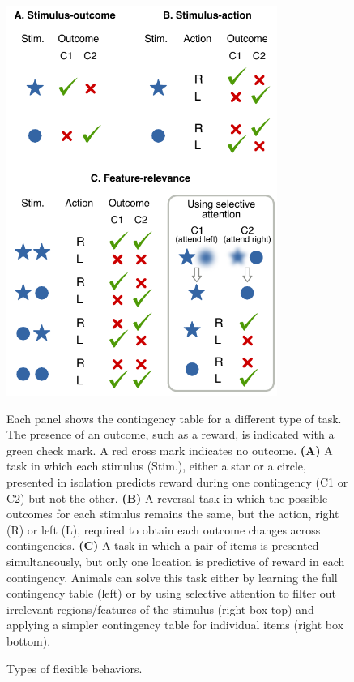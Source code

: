 \begin{figure}[hp]
  \begin{center}
    \includegraphics[height=5in]{figures/chapter5/figure_tasks}%
  \end{center}
\caption{Types of flexible behaviors.}{Each panel shows the contingency table for a different type of task. The presence of an outcome, such as a reward, is indicated with a green check mark. A red cross mark indicates no outcome. \textbf{(A)} A task in which each stimulus (Stim.), either a star or a circle, presented in isolation predicts reward during one contingency (C1 or C2) but not the other. \textbf{(B)} A reversal task in which the possible outcomes for each stimulus remains the same, but the action, right (R) or left (L), required to obtain each outcome changes across contingencies. \textbf{(C)} A task in which a pair of items is presented simultaneously, but only one location is predictive of reward in each contingency. Animals can solve this task either by learning the full contingency table (left) or by using selective attention to filter out irrelevant regions/features of the stimulus (right box top) and applying a simpler contingency table for individual items (right box bottom). 
}
\end{figure}


